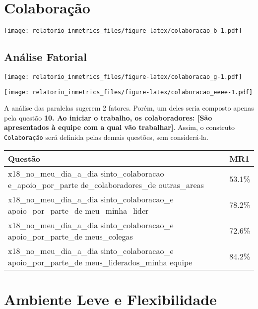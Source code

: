 \documentclass[]{book}
\begin{document}
\hypertarget{colaboracao}{%
\section{Colaboração}\label{colaboracao}}

\texttt{[image: relatorio\_inmetrics\_files/figure-latex/colaboracao\_b-1.pdf]}

\hypertarget{analise-fatorial-8}{%
\subsection{Análise Fatorial}\label{analise-fatorial-8}}

\texttt{[image: relatorio\_inmetrics\_files/figure-latex/colaboracao\_g-1.pdf]}

\texttt{[image: relatorio\_inmetrics\_files/figure-latex/colaboracao\_eeee-1.pdf]}

A análise das paralelas sugerem 2 fatores. Porém, um deles seria composto apenas pela questão \textbf{10. Ao iniciar o trabalho, os colaboradores: {[}São apresentados à equipe com a qual vão trabalhar{]}}. Assim, o construto \texttt{Colaboração} será definida pelas demais questões, sem considerá-la.

\begin{table}[H]
\centering\begingroup\fontsize{12}{14}\selectfont

\begin{tabular}{>{\raggedright\arraybackslash}p{20em}l}
\toprule
Questão & MR1\\
\midrule
x18\_no\_meu\_dia\_a\_dia
sinto\_colaboracao
e\_apoio\_por\_parte
de\_colaboradores\_de
outras\_areas & 53.1\%\\
x18\_no\_meu\_dia\_a\_dia
sinto\_colaboracao\_e
apoio\_por\_parte\_de
meu\_minha\_lider & 78.2\%\\
x18\_no\_meu\_dia\_a\_dia
sinto\_colaboracao\_e
apoio\_por\_parte\_de
meus\_colegas & 72.6\%\\
x18\_no\_meu\_dia\_a\_dia
sinto\_colaboracao\_e
apoio\_por\_parte\_de
meus\_liderados\_minha
equipe & 84.2\%\\
\bottomrule
\end{tabular}
\endgroup{}
\end{table}

\hypertarget{ambiente-leve-e-flexibilidade}{%
\section{Ambiente Leve e Flexibilidade}\label{ambiente-leve-e-flexibilidade}}
\end{document}
